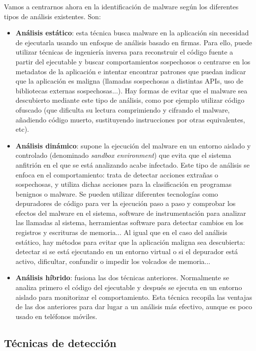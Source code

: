 Vamos a centrarnos ahora en la identificación de malware según los diferentes tipos de análisis existentes\hypersetup{citecolor=red}\cite{analysis}. Son:

\begin{itemize}
	\item \textbf{Análisis estático}: esta técnica busca malware en la aplicación sin necesidad de ejecutarla usando un enfoque de análisis basado en firmas. Para ello, puede utilizar técnicas de ingeniería inversa para reconstruir el código fuente a partir del ejecutable y buscar comportamientos sospechosos o centrarse en los metadatos de la aplicación e intentar encontrar patrones que puedan indicar que la aplicación es maligna (llamadas sospechosas a distintas APIs, uso de bibliotecas externas sospechosas...). Hay formas de evitar que el malware sea descubierto mediante este tipo de análisis, como por ejemplo utilizar código ofuscado (que dificulta su lectura comprimiendo y cifrando el malware, añadiendo código muerto, sustituyendo instrucciones por otras equivalentes, etc).
	\item \textbf{Análisis dinámico}: supone la ejecución del malware en un entorno aislado y controlado (denominado \textit{sandbox environment}) que evita que el sistema anfitrión en el que se está analizando acabe infectado. Este tipo de análisis se enfoca en el comportamiento: trata de detectar acciones extrañas o sospechosas, y utiliza dichas acciones para la clasificación en programas benignos o malware. Se pueden utilizar diferentes tecnologías como depuradores de código para ver la ejecución paso a paso y comprobar los efectos del malware en el sistema, software de instrumentación para analizar las llamadas al sistema, herramientas software para detectar cambios en los registros y escrituras de memoria... Al igual que en el caso del análisis estático, hay métodos para evitar que la aplicación maligna sea descubierta: detectar si se está ejecutando en un entorno virtual o si el depurador está activo, dificultar, confundir o impedir los volcados de memoria...
	\item \textbf{Análisis híbrido}: fusiona las dos técnicas anteriores. Normalmente se analiza primero el código del ejecutable y después se ejecuta en un entorno aislado para monitorizar el comportamiento. Esta técnica recopila las ventajas de las dos anteriores para dar lugar a un análisis más efectivo, aunque es poco usado en teléfonos móviles.
\end{itemize}

\subsection{Técnicas de detección}


